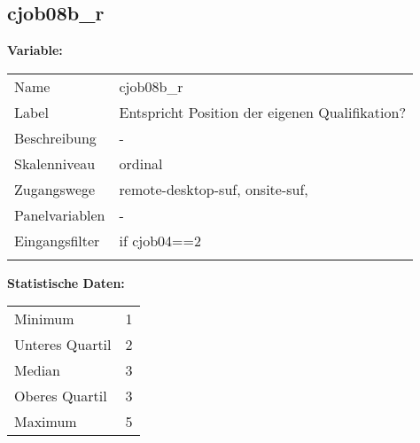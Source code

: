 	
	
	\subsection{cjob08b\_r}
	\label{subSection:cjob08b_r}

	\noindent\textbf{Variable:}\\
		\begin{tabular}{lL{11.3cm}}
			\label{tableVariable:cjob08b_r}
			Name & cjob08b\_r \\
			Label & Entspricht Position der eigenen Qualifikation? \\
			Beschreibung & - \\
			Skalenniveau & ordinal \\
			Zugangswege &
				remote-desktop-suf,
				onsite-suf,
 \\
			Panelvariablen & -
			 \\
			Eingangsfilter & if cjob04==2 \\
 \\
		\end{tabular}



		\vspace*{1 cm}
		\noindent\textbf{Statistische Daten:}\\
			\begin{tabular}{ll}
				\label{tableStatistics:cjob08b_r}
					Minimum & 1 \\
					Unteres Quartil & 2 \\
					Median & 3 \\
					Oberes Quartil & 3 \\
					Maximum & 5 \\
			\end{tabular}



